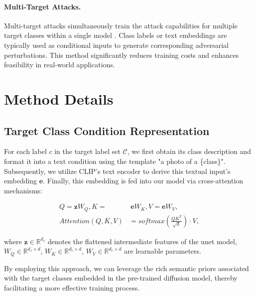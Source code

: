 \paragraph{Multi-Target Attacks.} Multi-target attacks simultaneously train the attack capabilities for multiple target classes within a single model \cite{han2019once, yang2022boosting, fang2025clip}. Class labels or text embeddings are typically used as conditional inputs to generate corresponding adversarial perturbations. This method significantly reduces training costs and enhances feasibility in real-world applications.


\section{Method Details}
\subsection{Target Class Condition Representation}
For each label $c$ in the target label set $\mathcal{C}$, we first obtain its class description and format it into a text condition using the template "a photo of a \{class\}"\cite{radford2021learning}. Subsequently, we utilize CLIP's text encoder to derive this textual input's embedding $\mathbf{e}$. Finally, this embedding is fed into our model via cross-attention mechanisms:


\begin{equation}
\begin{split}
Q= \mathbf{z}W_{Q}, K=&\  \mathbf{e}W_{K}, V =  \mathbf{e}W_{V}, \\
Attention(Q,K,V)&=softmax(\frac{QK^{T}}{\sqrt{d}}) \cdot V,  
\end{split}
\label{eq:cross_attn}
\end{equation}

\noindent where $\mathbf{z} \in \mathbb{R}^{d_{z}}$ denotes the flattened intermediate features of the unet model, $W_{Q}\in \mathbb{R}^{d_{z}\times d}$, $W_{K}\in \mathbb{R}^{d_{e}\times d}$, $W_{V}\in \mathbb{R}^{d_{e}\times d}$ are learnable parameters. 



By employing this approach, we can leverage the rich semantic priors associated with the target classes embedded in the pre-trained diffusion model, thereby facilitating a more effective training process.

